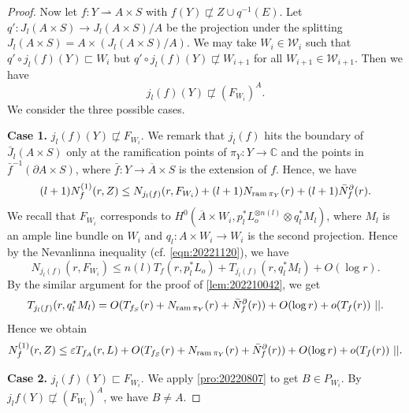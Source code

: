 \documentclass[11pt,english]{smfart}
\theoremstyle{plain}
\theoremstyle{definition}
\theoremstyle{remark}
\numberwithin{equation}{section}
\theoremstyle{plain}
\newcommand{\da}{\rightharpoonup}
\newcommand{\pN}[1]{\bar{N}_{#1}^{\partial}}
\newcommand{\ram}{{\rm ram}\,}
\begin{document}
\begin{proof}
		\par
		
		
		Now let $f:Y\da A\times S$ with $f(Y)\not\sqsubset Z\cup q^{-1}(E)$. 
		Let $q':J_l(A\times S)\to J_l(A\times S)/A$ be the projection under the splitting $J_l(A\times S)=A\times (J_l(A\times S)/A)$.
		We may take $W_i\in \mathcal{W}_i$ such that $q'\circ j_l(f)(Y)\sqsubset W_i$ but $q'\circ j_l(f)(Y)\not\sqsubset W_{i+1}$ for all $W_{i+1}\in \mathcal{W}_{i+1}$.
		Then we have
		\begin{equation}\label{eqn:130504}
			j_l(f)(Y)\not\sqsubset (F_{W_i})^A.
		\end{equation}
		We consider the three possible cases.
		
		\par
		
		\textbf{Case 1.} $j_l(f)(Y)\not\sqsubset F_{W_i}$.
		We remark that $j_l(f)$ hits the boundary of $\bar{J}_l(A\times S)$ only at the ramification points of $\pi _Y:Y\to \mathbb C$ and the points in $\bar{f}^{-1}(\partial A\times S)$, where $\bar{f}:Y\to \overline{A}\times S$ is the extension of $f$.
		Hence, we have
		$$(l+1)N^{(1)}_f(r,Z)\leq N_{j_l(f)}(r,F_{W_i})+(l+1)N_{\ram \pi _Y}(r)+(l+1)\pN{f}(r).$$
		We recall that $F_{W_i}$ corresponds to $H^0(\overline{A}\times W_i,p_l^*L_o^{\otimes n(l)}\otimes q _l^*M_l)$, where $M_l$ is an ample line bundle on $W_i$ and $q_l:A\times W_i\to W_i$ is the second projection.
		Hence by the Nevanlinna inequality (cf. \eqref{eqn:20221120}), we have
		$$
		N_{j_l(f)}(r,F_{W_i})\leq n(l)T_f(r, p_l^*L_o)+T_{j_l(f)}(r,q_l^*M_l)+O(\log r).
		$$
		By the similar argument for the proof of \cref{lem:202210042}, we get 	
		\begin{equation}\label{eqn:12092710}
			T_{ j_l(f)}(r,q_l^*M_l)=O (T_{f_S}(r)+N_{\ram \pi _Y}(r)+\pN{f}(r))+O(\log r)+o(T_f(r))\ ||.
		\end{equation}
		Hence we obtain
		\begin{equation*}\label{eqn:1209271}
			N^{(1)}_f(r,Z)\leq \varepsilon T_{f_A}(r,L)+O (T_{f_S}(r)+N_{\ram \pi _Y}(r)+\pN{f}(r))+O(\log r)+o(T_f(r))\ ||.
		\end{equation*}
		
		
		
		\par
		
		
		
		\textbf{Case 2. }$j_l(f)(Y)\sqsubset F_{W_i}$.
		We apply \cref{pro:20220807} to get $B\in P_{W_i}$.
		By $j_lf(Y)\not\sqsubset (F_{W_i})^A$, we have $B\not=A$.
		

\end{proof}
\end{document}
